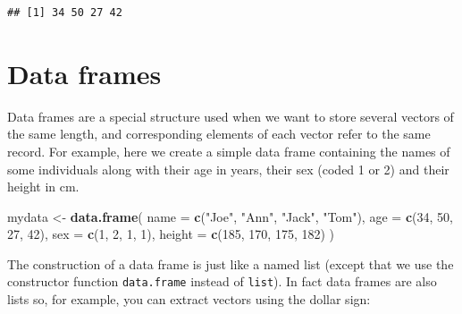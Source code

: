 \documentclass[
]{book}
\newenvironment{Shaded}{\begin{snugshade}}{\end{snugshade}}
\newcommand{\AttributeTok}[1]{\textcolor[rgb]{0.13,0.29,0.53}{#1}}
\newcommand{\DecValTok}[1]{\textcolor[rgb]{0.00,0.00,0.81}{#1}}
\newcommand{\FunctionTok}[1]{\textcolor[rgb]{0.13,0.29,0.53}{\textbf{#1}}}
\newcommand{\NormalTok}[1]{#1}
\newcommand{\OtherTok}[1]{\textcolor[rgb]{0.56,0.35,0.01}{#1}}
\newcommand{\SpecialCharTok}[1]{\textcolor[rgb]{0.81,0.36,0.00}{\textbf{#1}}}
\newcommand{\StringTok}[1]{\textcolor[rgb]{0.31,0.60,0.02}{#1}}
\theoremstyle{definition}
\theoremstyle{definition}
\theoremstyle{definition}
\theoremstyle{definition}
\theoremstyle{remark}
\begin{document}
\begin{Shaded}
\end{Shaded}

\begin{verbatim}
## [1] 34 50 27 42
\end{verbatim}

\section{Data frames}\label{data-frames}

Data frames are a special structure used when we want to store several vectors of the
same length, and corresponding elements of each vector refer to the same record.
For example, here we create a simple data frame containing the names of some individuals
along with their age in years, their sex (coded 1 or 2) and their height in cm.

\begin{Shaded}
\begin{Highlighting}[]
\NormalTok{mydata }\OtherTok{\textless{}{-}} \FunctionTok{data.frame}\NormalTok{(}
  \AttributeTok{name =} \FunctionTok{c}\NormalTok{(}\StringTok{"Joe"}\NormalTok{, }\StringTok{"Ann"}\NormalTok{, }\StringTok{"Jack"}\NormalTok{, }\StringTok{"Tom"}\NormalTok{),}
  \AttributeTok{age =} \FunctionTok{c}\NormalTok{(}\DecValTok{34}\NormalTok{, }\DecValTok{50}\NormalTok{, }\DecValTok{27}\NormalTok{, }\DecValTok{42}\NormalTok{), }
  \AttributeTok{sex =} \FunctionTok{c}\NormalTok{(}\DecValTok{1}\NormalTok{, }\DecValTok{2}\NormalTok{, }\DecValTok{1}\NormalTok{, }\DecValTok{1}\NormalTok{),}
  \AttributeTok{height =} \FunctionTok{c}\NormalTok{(}\DecValTok{185}\NormalTok{, }\DecValTok{170}\NormalTok{, }\DecValTok{175}\NormalTok{, }\DecValTok{182}\NormalTok{)}
\NormalTok{)}
\end{Highlighting}
\end{Shaded}

The construction of a data frame is just like a named list (except
that we use the constructor function \texttt{data.frame} instead of \texttt{list}). In fact data frames are also lists so, for example, you can
extract vectors using the dollar sign:

\begin{Shaded}
\end{Shaded}
\end{document}
